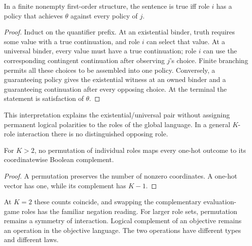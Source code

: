 \begin{proposition}
In a finite nonempty first-order structure, the sentence is true iff role
$i$ has a policy that achieves $\theta$ against every policy of $j$.
\end{proposition}
\begin{proof}
Induct on the quantifier prefix. At an existential binder, truth requires
some value with a true continuation, and role $i$ can select that value.
At a universal binder, every value must have a true continuation; role $i$
can use the corresponding contingent continuation after observing $j$'s
choice. Finite branching permits all these choices to be assembled into
one policy. Conversely, a guaranteeing policy gives the existential witness
at an owned binder and a guaranteeing continuation after every opposing
choice. At the terminal the statement is satisfaction of $\theta$.
\end{proof}

This interpretation explains the existential/universal pair without assigning
permanent logical polarities to the roles of the global language. In a
general $K$-role interaction there is no distinguished opposing role.

\begin{proposition}
For $K>2$, no permutation of individual roles maps every one-hot outcome to
its coordinatewise Boolean complement.
\end{proposition}
\begin{proof}
A permutation preserves the number of nonzero coordinates. A one-hot vector
has one, while its complement has $K-1$.
\end{proof}

At $K=2$ these counts coincide, and swapping the complementary evaluation-game
roles has the familiar negation reading. For larger role sets, permutation
remains a symmetry of interaction. Logical complement of an objective remains
an operation in the objective language. The two operations have different
types and different laws.
